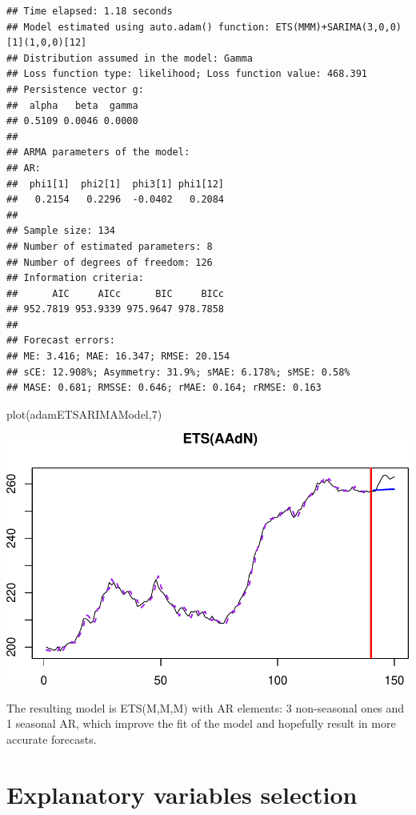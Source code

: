 \documentclass[
]{book}
\newenvironment{Shaded}{\begin{snugshade}}{\end{snugshade}}
\newcommand{\DecValTok}[1]{\textcolor[rgb]{0.00,0.00,0.81}{#1}}
\newcommand{\FunctionTok}[1]{\textcolor[rgb]{0.00,0.00,0.00}{#1}}
\newcommand{\NormalTok}[1]{#1}
\theoremstyle{definition}
\theoremstyle{definition}
\theoremstyle{definition}
\theoremstyle{definition}
\theoremstyle{remark}
\begin{document}
\begin{verbatim}
## Time elapsed: 1.18 seconds
## Model estimated using auto.adam() function: ETS(MMM)+SARIMA(3,0,0)[1](1,0,0)[12]
## Distribution assumed in the model: Gamma
## Loss function type: likelihood; Loss function value: 468.391
## Persistence vector g:
##  alpha   beta  gamma 
## 0.5109 0.0046 0.0000 
## 
## ARMA parameters of the model:
## AR:
##  phi1[1]  phi2[1]  phi3[1] phi1[12] 
##   0.2154   0.2296  -0.0402   0.2084 
## 
## Sample size: 134
## Number of estimated parameters: 8
## Number of degrees of freedom: 126
## Information criteria:
##      AIC     AICc      BIC     BICc 
## 952.7819 953.9339 975.9647 978.7858 
## 
## Forecast errors:
## ME: 3.416; MAE: 16.347; RMSE: 20.154
## sCE: 12.908%; Asymmetry: 31.9%; sMAE: 6.178%; sMSE: 0.58%
## MASE: 0.681; RMSSE: 0.646; rMAE: 0.164; rRMSE: 0.163
\end{verbatim}

\begin{Shaded}
\begin{Highlighting}[]
\FunctionTok{plot}\NormalTok{(adamETSARIMAModel,}\DecValTok{7}\NormalTok{)}
\end{Highlighting}
\end{Shaded}

\includegraphics{adam_files/figure-latex/unnamed-chunk-171-1.pdf}

The resulting model is ETS(M,M,M) with AR elements: 3 non-seasonal ones and 1 seasonal AR, which improve the fit of the model and hopefully result in more accurate forecasts.

\hypertarget{ETSXSelection}{%
\section{Explanatory variables selection}\label{ETSXSelection}}
\end{document}
